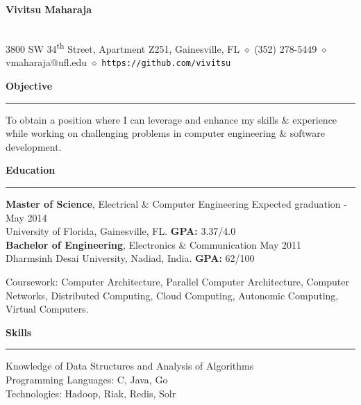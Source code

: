 \documentclass[10pt]{article}
\begin{document}
\begin{center}
\textbf{\Large Vivitsu Maharaja}
\date{}
\thispagestyle{empty}
\smallskip \\
3800 SW 34\textsuperscript{th} Street, Apartment Z251, Gainesville, FL $\diamond$ (352) 278-5449 $\diamond$ vmaharaja@ufl.edu $\diamond$ \texttt{https://github.com/vivitsu}
\end{center}

\textbf{Objective}
\smallskip
\hrule
To obtain a position where I can leverage and enhance my skills \& experience while working on challenging problems in computer engineering \& software development.

\textbf{Education}
\smallskip
\hrule
{\bf Master of Science}, Electrical \& Computer Engineering \hfill Expected graduation - May 2014\\
University of Florida, Gainesville, FL. {\bf GPA:} 3.37/4.0 \\
{\bf Bachelor of Engineering}, Electronics \& Communication \hfill May 2011\\
Dharmsinh Desai University, Nadiad, India. {\bf GPA:} 62/100

Coursework: Computer Architecture, Parallel Computer Architecture, Computer Networks, Distributed Computing, Cloud Computing, Autonomic Computing, Virtual Computers.

\textbf{Skills}
\smallskip
\hrule
Knowledge of Data Structures and Analysis of Algorithms\\
Programming Languages: C, Java, Go\\
Technologies: Hadoop, Riak, Redis, Solr
\end{document}
